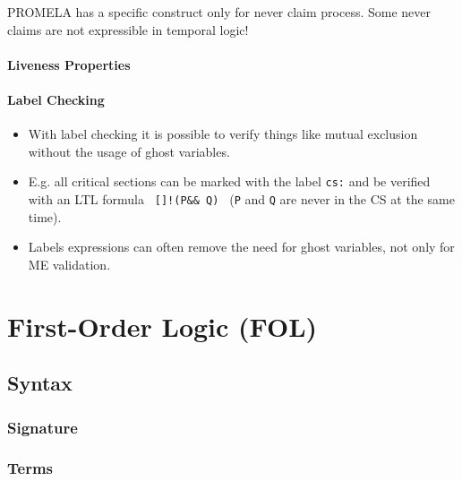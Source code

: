 \documentclass[a4paper, 11pt, accentcolor = tud3b]{tudreport}
\begin{document}
						PROMELA has a specific construct only for never claim process. Some never claims are not expressible in temporal logic!

				\subsubsection{Liveness Properties} %

				\subsubsection{Label Checking}
					\begin{itemize}
						\item With label checking it is possible to verify things like mutual exclusion without the usage of ghost variables.
						\item E.g. all critical sections can be marked with the label \texttt{cs:} and be verified with an LTL formula \texttt{ []!(P\@cs \&\& Q\@cs) } (\texttt{P} and \texttt{Q} are never in the CS at the same time).
						\item Labels expressions can often remove the need for ghost variables, not only for ME validation.
					\end{itemize}
		

	\chapter{First-Order Logic (FOL)} %

		\section{Syntax} %

			\subsection{Signature} %

			\subsection{Terms} %
\end{document}
